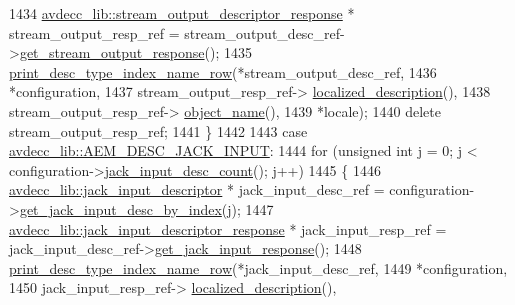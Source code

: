 \begin{DoxyCode}
1434                 \hyperlink{classavdecc__lib_1_1stream__output__descriptor__response}{avdecc\_lib::stream\_output\_descriptor\_response} 
      * stream\_output\_resp\_ref = stream\_output\_desc\_ref->\hyperlink{classavdecc__lib_1_1stream__output__descriptor_af92b70610c451a7f1eefcb71b3d97eb8}{get\_stream\_output\_response}();
1435                 \hyperlink{classcmd__line_ac47c21c03b69593b74e7c43201d0ba41}{print\_desc\_type\_index\_name\_row}(*stream\_output\_desc\_ref,
1436                                                *configuration,
1437                                                stream\_output\_resp\_ref->
      \hyperlink{classavdecc__lib_1_1stream__output__descriptor__response_a1fb9de45567df344090a1407aa6b775f}{localized\_description}(),
1438                                                stream\_output\_resp\_ref->
      \hyperlink{classavdecc__lib_1_1descriptor__response__base_a133f7774946d80f82b8aaaa4cfbb7361}{object\_name}(),
1439                                                *locale);
1440                 \textcolor{keyword}{delete} stream\_output\_resp\_ref;
1441             \}
1442 
1443         \textcolor{keywordflow}{case} \hyperlink{namespaceavdecc__lib_ac7b7d227e46bc72b63ee9e9aae15902fad87274c58574381f0b40cad5a6468978}{avdecc\_lib::AEM\_DESC\_JACK\_INPUT}:
1444             \textcolor{keywordflow}{for} (\textcolor{keywordtype}{unsigned} \textcolor{keywordtype}{int} j = 0; j < configuration->\hyperlink{classavdecc__lib_1_1configuration__descriptor_a35f643c39d514fca78d2536149b664a9}{jack\_input\_desc\_count}(); j++)
1445             \{
1446                 \hyperlink{classavdecc__lib_1_1jack__input__descriptor}{avdecc\_lib::jack\_input\_descriptor} * jack\_input\_desc\_ref = 
      configuration->\hyperlink{classavdecc__lib_1_1configuration__descriptor_a15cc383da412f84492d0d61cb581a8e1}{get\_jack\_input\_desc\_by\_index}(j);
1447                 \hyperlink{classavdecc__lib_1_1jack__input__descriptor__response}{avdecc\_lib::jack\_input\_descriptor\_response} * 
      jack\_input\_resp\_ref = jack\_input\_desc\_ref->\hyperlink{classavdecc__lib_1_1jack__input__descriptor_a860285ea152d9b0cf4160caca685b94f}{get\_jack\_input\_response}();
1448                 \hyperlink{classcmd__line_ac47c21c03b69593b74e7c43201d0ba41}{print\_desc\_type\_index\_name\_row}(*jack\_input\_desc\_ref,
1449                                                *configuration,
1450                                                jack\_input\_resp\_ref->
      \hyperlink{classavdecc__lib_1_1jack__input__descriptor__response_a1fb9de45567df344090a1407aa6b775f}{localized\_description}(),

\end{DoxyCode}

